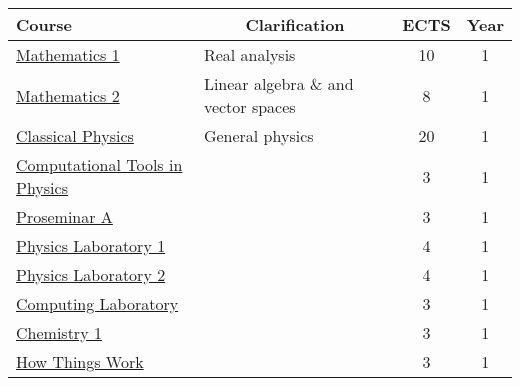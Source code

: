 \documentclass[11pt, a4paper]{article}
\begin{document}
\pagestyle{empty}
\begin{table}[htb!]
    \centering
    \begin{tabular}{|l|l|c|c|}
    \hline {\rule{0pt}{2.0ex}} \hspace{-7pt}

    \textbf{Course} & \multicolumn{1}{c}{\textbf{Clarification}} & \textbf{ECTS} & \textbf{Year}\\
    \hline
    \hline {\rule{0pt}{2.5ex}} \hspace{-7pt}
    \hyperref[mathematics-1]{Mathematics 1} & Real analysis & 10 & 1\\
    \hyperref[mathematics-2]{Mathematics 2} & Linear algebra \& and vector spaces & 8 & 1\\
    \hyperref[classical-physics]{Classical Physics} & General physics & 20 & 1\\
    \hyperref[computational-tools-in-physics]{Computational Tools in Physics} & & 3 & 1\\
    \hyperref[proseminar-a]{Proseminar A} & & 3 & 1\\
    \hyperref[physics-laboratory-1]{Physics Laboratory 1} & & 4 & 1\\
    \hyperref[physics-laboratory-2]{Physics Laboratory 2} & & 4 & 1\\
    \hyperref[computing-laboratory]{Computing Laboratory} & & 3 & 1\\
    \hyperref[chemistry-1]{Chemistry 1} & & 3 & 1\\
    \hyperref[how-things-work]{How Things Work} & & 3 & 1\\
    \hline
    \hline


\end{tabular}
\end{table}
\end{document}
